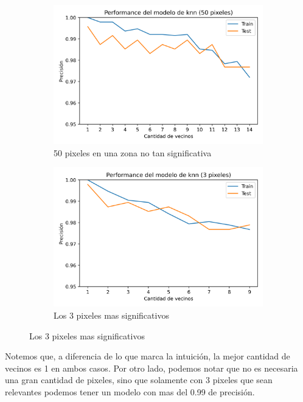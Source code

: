 \documentclass[10pt,a4paper]{article}
\begin{document}
\begin{figure}[ht!]
	\begin{subfigure}{0.5\textwidth}
		\includegraphics[width=0.9\linewidth]{Imagenes/50pixeles.png} 
		\caption{50 pixeles en una zona no tan significativa}
		\label{fig:subfig1}
	\end{subfigure}
	\begin{subfigure}{0.5\textwidth}
		\includegraphics[width=0.9\linewidth]{Imagenes/3pixeles.png}
		\caption{Los 3 pixeles mas significativos}
		\label{fig:subfig2}
	\end{subfigure}
	\label{fig:subfigs}
\end{figure}

Notemos que, a diferencia de lo que marca la intuición, la mejor cantidad de vecinos es 1 en ambos casos. Por otro lado, podemos notar que no es necesaria una gran cantidad de pixeles, sino que solamente con 3 pixeles que sean relevantes podemos tener un modelo con mas del 0.99 de precisión.
\end{document}
